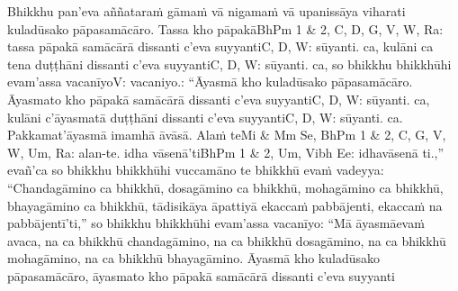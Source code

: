 Bhikkhu pan'eva aññataraṁ gāmaṁ vā nigamaṁ vā upanissāya viharati kuladūsako pāpasamācāro. Tassa kho pāpakā\makeatletter\hyperlink{endnote-appendix}\makeatother BhPm 1 & 2, C, D, G, V, W, Ra: tassa pāpakā samācārā dissanti c'eva suyyanti\makeatletter\hyperlink{endnote-appendix}\makeatother C, D, W: sūyanti. ca, kulāni ca tena duṭṭhāni dissanti c'eva suyyanti\makeatletter\hyperlink{endnote-appendix}\makeatother C, D, W: sūyanti. ca, so bhikkhu bhikkhūhi evam'assa vacanīyo\makeatletter\hyperlink{endnote-appendix}\makeatother V: vacaniyo.: ``Āyasmā kho kuladūsako pāpasamācāro. Āyasmato kho pāpakā samācārā dissanti c'eva suyyanti\makeatletter\hyperlink{endnote-appendix}\makeatother C, D, W: sūyanti. ca, kulāni c'āyasmatā duṭṭhāni dissanti c'eva suyyanti\makeatletter\hyperlink{endnote-appendix}\makeatother C, D, W: sūyanti. ca. Pakkamat'āyasmā imamhā āvāsā. Alaṁ te\makeatletter\hyperlink{endnote-appendix}\makeatother Mi & Mm Se, BhPm 1 & 2, C, G, V, W, Um, Ra: alan-te. idha vāsenā'ti\makeatletter\hyperlink{endnote-appendix}\makeatother BhPm 1 & 2, Um, Vibh Ee: idhavāsenā ti.,'' evañ'ca so bhikkhu bhikkhūhi vuccamāno te bhikkhū evaṁ vadeyya: ``Chandagāmino ca bhikkhū, dosagāmino ca bhikkhū, mohagāmino ca bhikkhū, bhayagāmino ca bhikkhū, tādisikāya āpattiyā ekaccaṁ pabbājenti, ekaccaṁ na pabbājentī'ti,'' so bhikkhu bhikkhūhi evam'assa vacanīyo: ``Mā āyasmā\makeatletter\hyperlink{endnote-appendix}\makeatother  evaṁ avaca, na ca bhikkhū chandagāmino, na ca bhikkhū dosagāmino, na ca bhikkhū mohagāmino, na ca bhikkhū bhayagāmino. Āyasmā kho kuladūsako pāpasamācāro, āyasmato kho pāpakā samācārā dissanti c'eva suyyanti\makeatletter\hyperlink{endnote-appendix}
